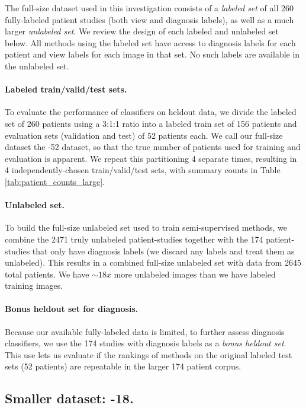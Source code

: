 The full-size dataset used in this investigation consists of a \emph{labeled set} of all 260 fully-labeled patient studies (both view and diagnosis labels), as well as a much larger \emph{unlabeled set}. We review the design of each labeled and unlabeled set below.
All methods using the labeled set have access to diagnosis labels for each patient and view labels for each image in that set. No such labels are available in the unlabeled set.

\paragraph{Labeled train/valid/test sets.}
To evaluate the performance of classifiers on heldout data, we divide the labeled set of 260 patients using a 3:1:1 ratio into a labeled train set of 156 patients and evaluation sets (validation and test) of 52 patients each.
We call our full-size dataset the -52 dataset, so that the true number of patients used for training and evaluation is apparent.
We repeat this partitioning 4 separate times, resulting in 4 independently-chosen train/valid/test sets, with summary counts in Table \ref{tab:patient_counts_large}. 

\paragraph{Unlabeled set.}
To build the full-size unlabeled set used to train semi-supervised methods, we combine the 2471 truly unlabeled patient-studies together with the 174 patient-studies that only have diagnosis labels (we discard any labels and treat them as unlabeled).
This results in a combined full-size unlabeled set with data from 2645 total patients. We have $\sim18x$ more unlabeled images than we have labeled training images.

\paragraph{Bonus heldout set for diagnosis.}
Because our available fully-labeled data is limited, to further assess diagnosis classifiers, we use the 174 studies with diagnosis labels as a \emph{bonus heldout set}. This use lets us evaluate if the rankings of methods on the original labeled test sets (52 patients) are repeatable in the larger 174 patient corpus.



\subsection{Smaller dataset: -18.}
\label{sec:data_small}

